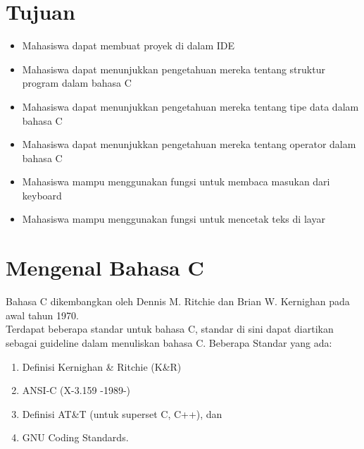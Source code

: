 \section{Tujuan}
\begin{itemize}[label=$\bullet$, itemsep=-1pt, leftmargin=*]
	\item Mahasiswa dapat membuat proyek di dalam IDE
	\item Mahasiswa dapat menunjukkan pengetahuan mereka tentang struktur program dalam bahasa C
	\item Mahasiswa dapat menunjukkan pengetahuan mereka tentang tipe data dalam bahasa C
	\item Mahasiswa dapat menunjukkan pengetahuan mereka tentang operator dalam bahasa C
    \item Mahasiswa mampu menggunakan fungsi untuk membaca masukan dari keyboard
    \item Mahasiswa mampu menggunakan fungsi untuk mencetak teks di layar

\end{itemize}
\section{Mengenal Bahasa C}

Bahasa C dikembangkan oleh Dennis M. Ritchie dan Brian W. Kernighan pada awal tahun 1970.\\
Terdapat beberapa standar untuk bahasa C, standar di sini dapat diartikan sebagai guideline dalam menuliskan bahasa C. Beberapa Standar yang ada:
\begin{enumerate}
	\item  Definisi Kernighan \& Ritchie (K\&R)
    \item ANSI-C (X-3.159 -1989-)
    \item Definisi AT\&T (untuk superset C, C++), dan
    \item GNU Coding Standards.
\end{enumerate}
